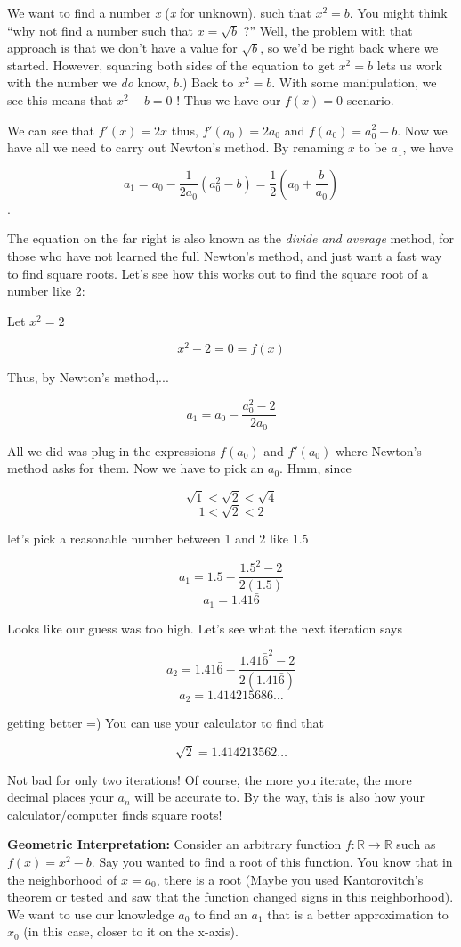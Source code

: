 \documentclass{article}
\begin{document}
We want to find a number \emph{x} (\emph{x} for unknown), such that $x^2=b$. You might think ``why not find 
a number such that  $x=\sqrt{b}$ ?'' Well, the problem with that approach is that we don't have a value for $\sqrt{b}$, so we'd be right back where we started. However, squaring both sides of the equation to get $x^2 = b$ lets us work with the number we \emph{do} know, $b$.)  Back to $x^2=b$.  With some manipulation, we see this means that $x^2-b=0$ ! Thus we have our $f(x)=0$ scenario.

We can see that $f'(x)=2x$ thus, $f'(a_0)=2a_0$ and $f(a_0)=a_0^2-b$. Now we have all we need to carry out Newton's method. By renaming $x$ to be $a_1$, we have 

$$a_1 = a_0 - \frac{1}{2a_0}(a_0^2-b) = \frac{1}{2}\left(a_0+\frac{b}{a_0}\right)$$.

The equation on the far right is also known as the \emph{divide and average} method, for those who have not learned the full Newton's method, and just want a fast way to find square roots. Let's see how this works out to find the square root of a number like 2:

Let $x^2=2$

$$x^2-2=0=f(x)$$

Thus, by Newton's method,...

$$a_1 = a_0 - \frac{a_0^2-2}{2a_0}$$

All we did was plug in the expressions $f(a_0)$ and $f'(a_0)$ where Newton's method asks for them. Now we have to pick an $a_0$. Hmm, since

$$\sqrt{1}<\sqrt{2}<\sqrt{4}$$
$$1<\sqrt{2}<2$$ 

let's pick a reasonable number between 1 and 2 like 1.5

$$a_1 = 1.5 - \frac{1.5^2-2}{2(1.5)}$$
$$a_1 = 1.41\bar{6}$$ 

Looks like our guess was too high. Let's see what the next iteration says

$$a_2 = 1.41\bar{6} - \frac{1.41\bar{6}^2-2}{2(1.41\bar{6})}$$
$$a_2 = 1.414215686\dots$$ 

getting better =) You can use your calculator to find that

$$\sqrt{2} = 1.414213562\dots$$

Not bad for only two iterations! Of course, the more you iterate, the more decimal places your $a_n$ will be accurate to. By the way, this is also how your calculator/computer finds square roots!

\textbf{Geometric Interpretation:} Consider an arbitrary function $f\colon\mathbb{R}\rightarrow\mathbb{R}$ such as $f(x)=x^2-b$. Say you wanted to find a root of this function. You know that in the neighborhood of $x=a_0$, there is a root (Maybe you used Kantorovitch's theorem or tested and saw that the function changed signs in this neighborhood). We want to use our knowledge $a_0$ to find an $a_1$ that is a better approximation to $x_0$ (in this case, closer to it on the x-axis).
\end{document}
